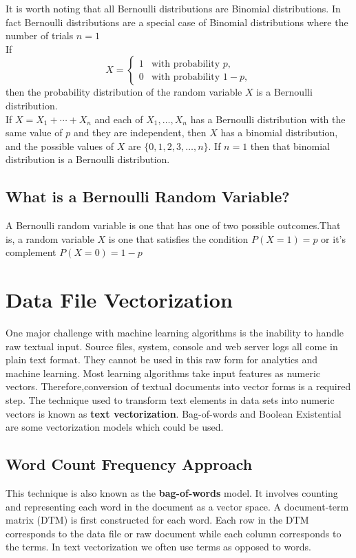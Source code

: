 \documentclass[12pt, letterpaper, titlepage]{report}
\begin{document}
It is worth noting that all Bernoulli distributions are Binomial distributions. In fact Bernoulli distributions are a special case of Binomial distributions where the number of trials $n=1$\\

If
$$
X=\begin{cases} 1 & \text{with probability }p, \\ 0 & \text{with probability }1-p, \end{cases}
$$
then the probability distribution of the random variable $X$ is a Bernoulli distribution.\\

If $X=X_1+\cdots+X_n$ and each of $X_1,\ldots,X_n$ has a Bernoulli distribution with the same value of $p$ and they are independent, then $X$ has a binomial distribution, and the possible values of $X$ are $\{0,1,2,3,\ldots,n\}$.  If $n=1$ then that binomial distribution is a Bernoulli distribution.

\subsection*{What is a Bernoulli Random Variable?}
A Bernoulli random variable is one that has one of two possible outcomes.That is, a random variable $X$ is one that satisfies the condition $P(X=1) = p$ or it's complement $P(X=0) = 1 - p$ 


\section{Data File Vectorization}
One major challenge with machine learning algorithms is the inability to handle raw textual input. Source files, system, console and web server logs all come in plain text format. They cannot be used in this raw form for analytics and machine learning. Most learning algorithms take input features as numeric vectors. Therefore,conversion of textual documents into vector forms is a required step. The technique used to transform text elements in data sets into numeric vectors is known as \textbf{text vectorization}. Bag-of-words and Boolean Existential are some vectorization models which could be used.
\subsection{Word Count Frequency Approach}
This technique is also known as the \textbf{bag-of-words} model. It involves counting and representing each word in the document as a vector space. A document-term matrix (DTM) is first constructed for each word. Each row in the DTM corresponds to the data file or raw document while each column corresponds to the terms. In text vectorization we often use terms as opposed to words.
\end{document}
